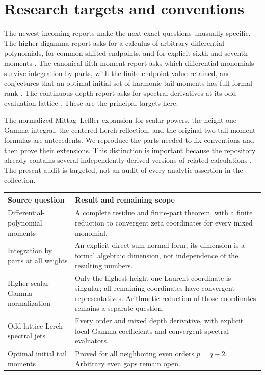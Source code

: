 \section{Research targets and conventions}
\label{poly:scope}

The newest incoming reports make the next exact questions unusually
specific. The higher-digamma report asks for a calculus of arbitrary
differential polynomials, for common shifted endpoints, and for explicit
sixth and seventh moments \cite{Higher}. The canonical fifth-moment report
asks which differential monomials survive integration by parts, with the
finite endpoint value retained, and conjectures that an optimal initial
set of harmonic-tail moments has full formal rank \cite{Fifth}.
The continuous-depth report asks for spectral derivatives at its odd
evaluation lattice \cite{Continuous}. These are the principal targets here.

The normalized Mittag--Leffler expansion for scalar powers, the
height-one Gamma integral, the centered Lerch reflection, and the original
two-tail moment formulas are antecedents. We reproduce the parts needed
to fix conventions and then prove their extensions. This distinction is
important because the repository already contains several independently
derived versions of related calculations \cite{Repo,Mixed,Tilted,Algebraic}.
The present audit is targeted, not an audit of every analytic assertion in
the collection.

\begin{center}
\small
\begin{tabular}{p{}p{}}
\toprule
Source question & Result and remaining scope\\
\midrule
Differential-polynomial moments & A complete residue and finite-part
theorem, with a finite reduction to convergent zeta coordinates for every
mixed monomial.\\[4pt]
Integration by parts at all weights & An explicit direct-sum normal form;
its dimension is a formal algebraic dimension, not independence of
the resulting numbers.\\[4pt]
Higher scalar Gamma normalization & Only the highest height-one Laurent
coordinate is singular; all remaining coordinates have convergent
representatives. Arithmetic reduction of those coordinates remains a
separate question.\\[4pt]
Odd-lattice Lerch spectral jets & Every order and mixed depth derivative,
with explicit local Gamma coefficients and convergent spectral evaluators.\\[4pt]
Optimal initial tail moments & Proved for all neighboring even orders
$p=q-2$. Arbitrary even gaps remain open.\\
\bottomrule
\end{tabular}
\end{center}

